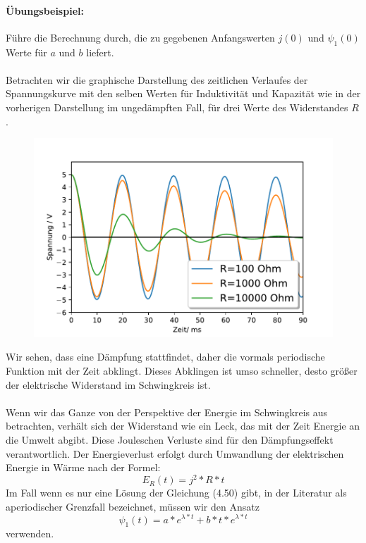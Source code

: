 \documentclass[11pt,a4paper,leqno]{report}
\numberwithin{equation}{chapter}
\begin{document}
\paragraph{\"Ubungsbeispiel:} F\"uhre die Berechnung durch, die zu gegebenen Anfangswerten $j(0)$ und $\psi_1(0)$ Werte f\"ur $a$ und $b$ liefert.\\
\\
Betrachten wir die graphische Darstellung des zeitlichen Verlaufes der Spannungskurve mit den selben Werten f\"ur Induktivit\"at und Kapazit\"at wie in der vorherigen Darstellung im unged\"ampften Fall, f\"ur drei Werte des Widerstandes $R$.
\begin{figure}[H]
	\begin{center}
		\includegraphics[scale=0.75]{dampf.pdf}
	\end{center}
\end{figure}
\noindent
Wir sehen, dass eine D\"ampfung stattfindet, daher die vormals periodische Funktion mit der Zeit abklingt. Dieses Abklingen ist umso schneller, desto gr\"o\ss{}er der elektrische Widerstand im Schwingkreis ist.\\
\\
Wenn wir das Ganze von der Perspektive der Energie im Schwingkreis aus betrachten, verh\"alt sich der Widerstand wie ein Leck, das mit der Zeit Energie an die Umwelt abgibt. Diese Jouleschen Verluste sind f\"ur den D\"ampfungseffekt verantwortlich. Der Energieverlust erfolgt durch Umwandlung der elektrischen Energie in W\"arme nach der Formel:
\begin{equation}
	E_R(t) = j^2*R*t
\end{equation}
Im Fall wenn es nur eine L\"osung der Gleichung (4.50) gibt, in der Literatur als aperiodischer Grenzfall bezeichnet,  m\"ussen wir den Ansatz 
\begin{equation}
	\psi_1(t) = a*e^{\lambda*t} + b*t*e^{\lambda*t}
\end{equation}verwenden. 
\end{document}
